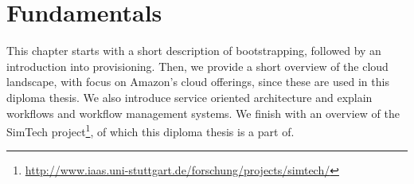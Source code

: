 \chapter{Fundamentals}
\label{fundamentals}

This chapter starts with a short description of bootstrapping, followed by an introduction into provisioning.
Then, we provide a short overview of the cloud landscape, with focus on Amazon's cloud offerings, since these are used in this diploma thesis.
We also introduce service oriented architecture and explain workflows and workflow management systems.
We finish with an overview of the SimTech project\footnote{\url{http://www.iaas.uni-stuttgart.de/forschung/projects/simtech/}}, of which this diploma thesis is a part of.







